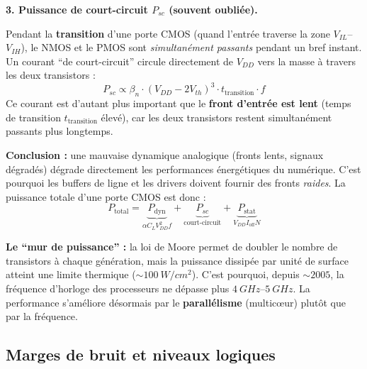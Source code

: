 \documentclass[12pt,a4paper,twoside]{book}
\begin{document}
\begin{intuition}
\textbf{3. Puissance de court-circuit $P_{sc}$ (souvent oubliée).}

Pendant la \textbf{transition} d'une porte CMOS (quand l'entrée traverse la zone $V_{IL}$--$V_{IH}$), le NMOS et le PMOS sont \textit{simultanément passants} pendant un bref instant. Un courant ``de court-circuit'' circule directement de $V_{DD}$ vers la masse à travers les deux transistors :
\[
P_{sc} \propto \beta_n \cdot (V_{DD} - 2V_{th})^3 \cdot t_{\text{transition}} \cdot f
\]
Ce courant est d'autant plus important que le \textbf{front d'entrée est lent} (temps de transition $t_{\text{transition}}$ élevé), car les deux transistors restent simultanément passants plus longtemps.

\textbf{Conclusion :} une mauvaise dynamique analogique (fronts lents, signaux dégradés) dégrade directement les performances énergétiques du numérique. C'est pourquoi les buffers de ligne et les drivers doivent fournir des fronts \textit{raides}. La puissance totale d'une porte CMOS est donc :
\[
P_{\text{total}} = \underbrace{P_{\text{dyn}}}_{\alpha C_L V_{DD}^2 f} + \underbrace{P_{sc}}_{\text{court-circuit}} + \underbrace{P_{\text{stat}}}_{V_{DD} I_{\text{off}} N}
\]
\end{intuition}

\begin{attention}
\textbf{Le ``mur de puissance'' :} la loi de Moore permet de doubler le nombre de transistors à chaque génération, mais la puissance dissipée par unité de surface atteint une limite thermique ($\sim\SI{100}{W/cm^2}$). C'est pourquoi, depuis $\sim 2005$, la fréquence d'horloge des processeurs ne dépasse plus $\SI{4}{GHz}$--$\SI{5}{GHz}$. La performance s'améliore désormais par le \textbf{parallélisme} (multicœur) plutôt que par la fréquence.
\end{attention}

\subsection{Marges de bruit et niveaux logiques}
\end{document}
